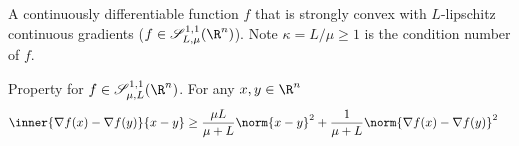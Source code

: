\documentclass[../summary.tex]{subfiles}
\begin{document}
\begin{definition}
    A continuously differentiable function $f$ that is strongly convex with $L$-lipschitz continuous gradients ($f\in\scrS^{1,1}_{L,\mu}(\R^n)$). Note $\kappa = L/\mu \geq 1$ is the condition number of $f$.
\end{definition}

\noindent Property for $f\in\scrS_{\mu,L}^{1,1}(\R^n)$. For any $x,y\in\R^n$
\begin{align}
    \inner{\nabla f(x) - \nabla f(y)}{x-y}
        &\geq \frac{\mu L}{\mu + L}\norm{x-y}^2 + \frac{1}{\mu+L} \norm{\nabla f(x) - \nabla f(y)}^2
\end{align}
\end{document}

